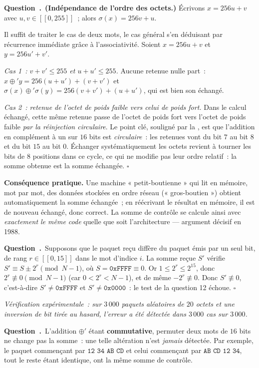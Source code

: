 \documentclass[11pt,a4paper]{article}
\renewcommand{\Q}{\medskip\par\stepcounter{qcnt}\noindent\textbf{\color{cnc}Question~\theqcnt.}~}
\begin{document}
\Q \textbf{(Indépendance de l'ordre des octets.)} Écrivons $x=256u+v$ avec
$u,v\in[\![0,255]\!]$~; alors $\sigma(x)=256v+u$.

Il suffit de traiter le cas de deux mots, le cas général s'en déduisant par récurrence
immédiate grâce à l'associativité. Soient $x=256u+v$ et $y=256u'+v'$.

\emph{Cas 1~: $v+v'\le 255$ et $u+u'\le 255$.} Aucune retenue nulle part~:
$x\oplus' y=256(u+u')+(v+v')$ et $\sigma(x)\oplus'\sigma(y)=256(v+v')+(u+u')$, qui est bien
son échangé.

\emph{Cas 2~: retenue de l'octet de poids faible vers celui de poids fort.} Dans le calcul
échangé, cette même retenue passe de l'octet de poids fort vers l'octet de poids faible
\emph{par la réinjection circulaire}. Le point clé, souligné par la , est que
l'addition en complément à un sur $16$ bits est \emph{circulaire}~: les retenues vont du bit
$7$ au bit $8$ et du bit $15$ au bit $0$. Échanger systématiquement les octets revient à
tourner les bits de $8$ positions dans ce cycle, ce qui ne modifie pas leur ordre relatif~:
la somme obtenue est la somme échangée. \hfill$\square$

\textbf{Conséquence pratique.} Une machine « petit-boutienne » qui lit en mémoire, mot par
mot, des données stockées en ordre réseau (« gros-boutien ») obtient automatiquement la somme
échangée~; en réécrivant le résultat en mémoire, il est de nouveau échangé, donc correct. La
somme de contrôle se calcule ainsi avec \emph{exactement le même code} quelle que soit
l'architecture — argument décisif en 1988.

\Q Supposons que le paquet reçu diffère du paquet émis par un seul bit, de rang
$r\in[\![0,15]\!]$ dans le mot d'indice $i$. La somme reçue $S'$ vérifie
$S'\equiv S\pm 2^{r}\pmod{N-1}$, où $S=\texttt{0xFFFF}\equiv 0$. Or $1\le 2^{r}\le 2^{15}$,
donc $2^{r}\not\equiv 0 \pmod{N-1}$ (car $0<2^r<N-1$), et de même $-2^r\not\equiv 0$. Donc
$S'\not\equiv 0$, c'est-à-dire $S'\ne\texttt{0xFFFF}$ et $S'\ne\texttt{0x0000}$~: le test de
la question 12 échoue. \hfill$\square$

\emph{Vérification expérimentale~: sur $3\,000$ paquets aléatoires de $20$ octets et une
inversion de bit tirée au hasard, l'erreur a été détectée dans $3\,000$ cas sur $3\,000$.}

\Q L'addition $\oplus'$ étant \textbf{commutative}, permuter deux mots de $16$ bits ne change
pas la somme~: une telle altération n'est \emph{jamais} détectée. Par exemple, le paquet
commençant par $\texttt{12 34 AB CD}$ et celui commençant par $\texttt{AB CD 12 34}$, tout le
reste étant identique, ont la même somme de contrôle.
\end{document}
